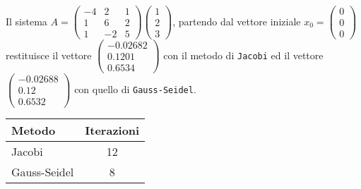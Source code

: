 

Il sistema $A = \left(\begin{array}{ccc} -4 & 2 & 1\\ 1 & 6 & 2\\ 1 & -2 & 5 \end{array}\right) \left(\begin{array}{c} 1\\ 2\\ 3 \end{array}\right)$, partendo dal vettore iniziale $x_0 = \left(\begin{array}{c} 0\\ 0\\ 0 \end{array}\right)$\\ restituisce il vettore $\left(\begin{array}{c} -0.02682\\ 0.1201\\ 0.6534 \end{array}\right)$ con il metodo di \texttt{Jacobi} ed il vettore $\left(\begin{array}{c} -0.02688\\ 0.12\\ 0.6532 \end{array}\right)$ con quello di \texttt{Gauss-Seidel}.\\

\begin{tabular}{l c}
\hline
Metodo & Iterazioni\\
\hline
Jacobi & 12 \\
Gauss-Seidel & 8\\
\hline
\end{tabular}